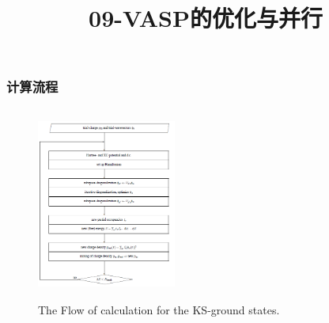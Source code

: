 \frame
{
	\frametitle{计算流程}
\begin{figure}[h!]
	\vspace{-0.2in}
\centering
\includegraphics[height=2.5in,width=1.8in,viewport=0 0 480 630,clip]{Figures/VASP_procedure.png}
\caption{\tiny \textrm{The Flow of calculation for the KS-ground states.}}%
\label{PAW_baiseset}
\end{figure} 
}
\title{09-\rm{VASP}的优化与并行}
%

